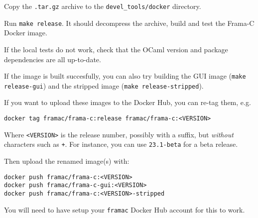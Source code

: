 Copy the \texttt{.tar.gz} archive to the \texttt{devel\_tools/docker} directory.

Run \texttt{make release}. It should decompress the archive, build and test
the Frama-C Docker image.

If the local tests do not work, check that the OCaml version and package
dependencies are all up-to-date.

If the image is built succesfully, you can also try building the GUI image
(\texttt{make release-gui}) and the stripped image
(\texttt{make release-stripped}).

If you want to upload these images to the Docker Hub, you can re-tag them, e.g.

\begin{lstlisting}
docker tag framac/frama-c:release framac/frama-c:<VERSION>
\end{lstlisting}

Where \texttt{<VERSION>} is the release number, possibly with a suffix, but
{\em without} characters such as \texttt{+}. For instance, you can use
\texttt{23.1-beta} for a beta release.

Then upload the renamed image(s) with:

\begin{lstlisting}
docker push framac/frama-c:<VERSION>
docker push framac/frama-c-gui:<VERSION>
docker push framac/frama-c:<VERSION>-stripped
\end{lstlisting}
You will need to have setup your \texttt{framac} Docker Hub account for this to work.

